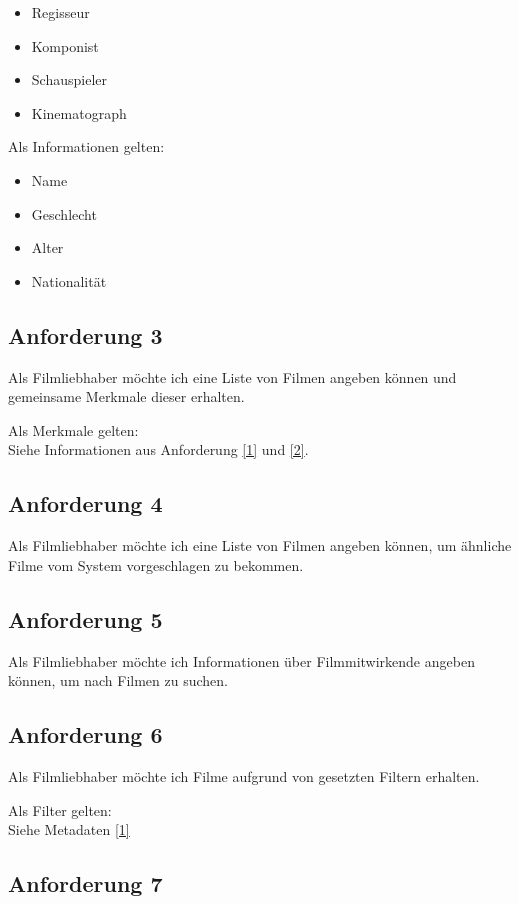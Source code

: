 \documentclass[conference]{IEEEtran}
\begin{document}
\begin{itemize}
	\item Regisseur
	\item Komponist
	\item Schauspieler
	\item Kinematograph
\end{itemize}

Als Informationen gelten:

\begin{itemize}
	\item Name
	\item Geschlecht
	\item Alter
	\item Nationalität
\end{itemize}

\subsection{Anforderung 3}

Als Filmliebhaber möchte ich eine Liste von Filmen angeben können
und gemeinsame Merkmale dieser erhalten.

Als Merkmale gelten:
\\
Siehe Informationen aus Anforderung \ref{1} und \ref{2}.

\subsection{Anforderung 4}

Als Filmliebhaber möchte ich eine Liste von Filmen angeben können,
um ähnliche Filme vom System vorgeschlagen zu bekommen.


\subsection{Anforderung 5}
Als Filmliebhaber möchte ich Informationen über Filmmitwirkende angeben können,
um nach Filmen zu suchen.

\subsection{Anforderung 6}

Als Filmliebhaber möchte ich Filme aufgrund von gesetzten Filtern erhalten.

Als Filter gelten:
\\
Siehe Metadaten \ref{1}

\subsection{Anforderung 7}
\end{document}
